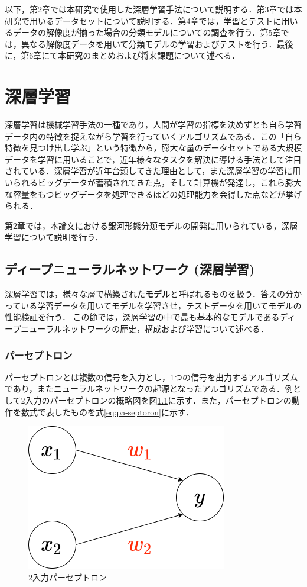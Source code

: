 \documentclass[a4j, 11pt]{jreport}
\begin{document}
以下，第2章では本研究で使用した深層学習手法について説明する．第3章では本研究で用いるデータセットについて説明する．第4章では，学習とテストに用いるデータの解像度が揃った場合の分類モデルについての調査を行う．第5章では，異なる解像度データを用いて分類モデルの学習およびテストを行う．最後に，第6章にて本研究のまとめおよび将来課題について述べる．


\newpage
\chapter{深層学習}
深層学習は機械学習手法の一種であり，人間が学習の指標を決めずとも自ら学習データ内の特徴を捉えながら学習を行っていくアルゴリズムである．この「自ら特徴を見つけ出し学ぶ」という特徴から，膨大な量のデータセットである大規模データを学習に用いることで，近年様々なタスクを解決に導ける手法として注目されている．深層学習が近年台頭してきた理由として，また深層学習の学習に用いられるビッグデータが蓄積されてきた点，そして計算機が発達し，これら膨大な容量をもつビッグデータを処理できるほどの処理能力を会得した点などが挙げられる．

第2章では，本論文における銀河形態分類モデルの開発に用いられている，深層学習について説明を行う．

\section{ディープニューラルネットワーク (深層学習)}
深層学習では，様々な層で構築された\textbf{モデル}と呼ばれるものを扱う．答えの分かっている学習データを用いてモデルを学習させ，テストデータを用いてモデルの性能検証を行う．
この節では，深層学習の中で最も基本的なモデルであるディープニューラルネットワークの歴史，構成および学習について述べる．

\subsection{パーセプトロン}
パーセプトロンとは複数の信号を入力とし，1つの信号を出力するアルゴリズムであり，またニューラルネットワークの起源となったアルゴリズムである．例として2入力のパーセプトロンの概略図を図\ref{fig:pa-septoron}に示す．また，パーセプトロンの動作を数式で表したものを式\ref{eq:pa-septoron}に示す．

\begin{figure}[H]
  \centering
  \includegraphics[width=0.50\hsize, keepaspectratio]{images/drawio/pa-seputoron.png}
  \caption{2入力パーセプトロン}
  \label{fig:pa-septoron}
 \end{figure}
\end{document}
